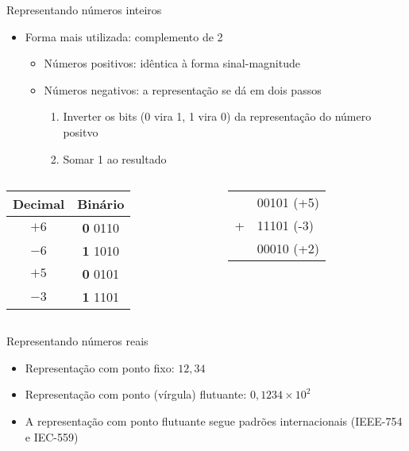 \documentclass[t, aspectratio=169]{beamer}
\begin{document}
\begin{frame}[label={sec:orgcd5bf8e}]{Representando números inteiros}
\begin{itemize}
\item Forma mais utilizada: \alert{complemento de 2}
\begin{itemize}
\item Números positivos: idêntica à forma sinal-magnitude
\item Números negativos: a representação se dá em dois passos
\begin{enumerate}
\item Inverter os bits (0 vira 1, 1 vira 0) da representação do número positvo
\item Somar 1 ao resultado
\end{enumerate}
\end{itemize}
\end{itemize}

\begin{columns}
\begin{column}{0.5\columnwidth}
\begin{center}
\begin{tabular}{*{2}{c}}
\toprule
\alert{Decimal} & \alert{Binário}\\
\midrule
\(+6\) & {\bfseries\color{highlight}0} 0110\\
\(-6\) & {\bfseries\color{highlight}1} 1010\\
\(+5\) & {\bfseries\color{highlight}0} 0101\\
\(-3\) & {\bfseries\color{highlight}1} 1101\\
\bottomrule
\end{tabular}
\end{center}
\end{column}

\begin{column}{0.5\columnwidth}
\begin{center}
\begin{tabular}{ll}
 & 00101 (+5)\\
+ & 11101 (-3)\\
\hline
 & 00010  (+2)\\
\end{tabular}
\end{center}
\end{column}
\end{columns}
\end{frame}

\begin{frame}[label={sec:orgc307681}]{Representando números reais}
\begin{itemize}
\item Representação com ponto fixo: \(12,34\)
\item Representação com \alert{ponto (vírgula) flutuante}: \(0,1234 \times 10^{2}\)
\item A representação com ponto flutuante segue padrões internacionais
(IEEE-754 e IEC-559)
\end{itemize}
\end{frame}
\end{document}

